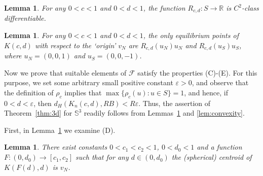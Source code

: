 \documentclass[twoside]{amsart}
\theoremstyle{plain}
\newtheorem{lemma}[theorem]{Lemma}
\theoremstyle{definition}
\numberwithin{equation}{section}
\renewcommand{\Re}{\mathbb R}
\newcommand{\Sph}{\mathbb{S}}
\begin{document}
\begin{lemma}\label{lem:C2}
For any $0 < c < 1$ and $0 < d < 1$, the function $R_{c,d} : S \to \Re$ is $C^2$-class differentiable.
\end{lemma}

\begin{lemma}\label{lem:equilibria}
For any $0 < c < 1$ and $ 0 < d < 1$, the only equilibrium points of $K(c,d)$ with respect to the `origin' $v_N$ are $R_{c,d}(u_N) u_N$ and $R_{c,d}(u_S) u_S$, where $u_N=(0,0,1)$ and $u_S=(0,0,-1)$.
\end{lemma}

Now we prove that suitable elements of $\mathcal{F}$ satisfy the properties (C)-(E).
For this purpose, we set some arbitrary small positive constant $\varepsilon > 0$, and observe that the definition of $\rho_c$ implies that $\max \{ \rho_c(u) : u \in S \} = 1$, and hence, if $0 < d < \varepsilon$, then $d_H(K_n(c,d), R B) < R \varepsilon$. Thus, the assertion of Theorem~\ref{thm:3d} for $\Sph^3$ readily follows from Lemmas~\ref{lem:centering} and \ref{lem:convexity}.

First, in Lemma~\ref{lem:centering} we examine (D). 

\begin{lemma}\label{lem:centering}
There exist constants $0 < c_1 < c_2 < 1$, $0 < d_0 < 1$ and a function $F:(0,d_0) \to [c_1,c_2]$ such that for any $d \in (0,d_0)$
the (spherical) centroid of $K(F(d),d)$ is $v_N$.
\end{lemma}
\end{document}
